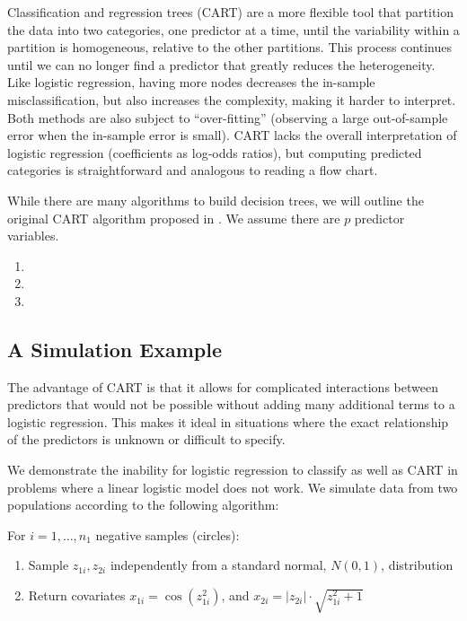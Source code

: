 \documentclass[11pt]{article}
\begin{document}
Classification and regression trees (CART) \cite{breiman1984classification} are a more flexible tool that partition the data into two categories, one predictor at a time, until the variability within a partition is homogeneous, relative to the other partitions. This process continues until we can no longer find a predictor that greatly reduces the heterogeneity. Like logistic regression, having more nodes decreases the in-sample misclassification, but also increases the complexity, making it harder to interpret. Both methods are also subject to ``over-fitting'' (observing a large out-of-sample error when the in-sample error is small). CART lacks the overall interpretation of logistic regression (coefficients as log-odds ratios), but computing predicted categories is straightforward and analogous to reading a flow chart. 

While there are many algorithms to build decision trees, we will outline the original CART algorithm proposed in \cite{breiman1984classification}. We assume there are $p$ predictor variables.

\begin{enumerate}[1.]
\item 
\item 
\item 
\end{enumerate}

\subsection*{A Simulation Example}
The advantage of CART is that it allows for complicated interactions between predictors that would not be possible without adding many additional terms to a logistic regression. This makes it ideal in situations where the exact relationship of the predictors is unknown or difficult to specify.

We demonstrate the inability for logistic regression to classify as well as CART in problems where a linear logistic model does not work. We simulate data from two populations according to the following algorithm:

For $i=1, \dots, n_1$ negative samples (circles):
\begin{enumerate}
\item Sample $z_{1i}, z_{2i}$ independently from a standard normal, $N(0,1)$, distribution
\item Return covariates $x_{1i} = \cos(z_{1i}^2)$, and $x_{2i} = \left|z_{2i} \right| \cdot \sqrt{z_{1i}^2 + 1}$
\end{enumerate}
\end{document}

